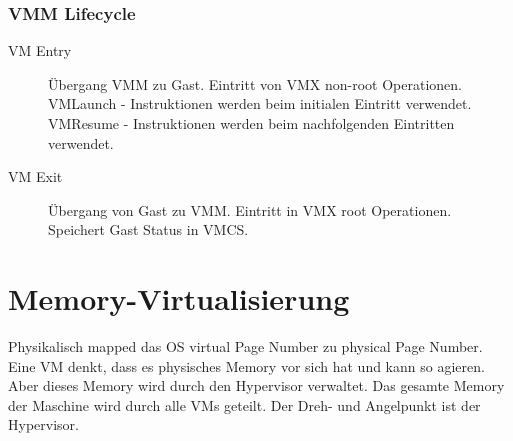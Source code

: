\subsubsection{VMM Lifecycle}
\label{sec:vmm-lifecycle}
\begin{description}
	\item[VM Entry] Übergang VMM zu Gast. Eintritt von VMX non-root Operationen. VMLaunch - Instruktionen werden beim initialen Eintritt verwendet. VMResume - Instruktionen werden beim nachfolgenden Eintritten verwendet.
	\item[VM Exit] Übergang von Gast zu VMM. Eintritt in VMX root Operationen. Speichert Gast Status in VMCS.
\end{description}

\section{Memory-Virtualisierung}
Physikalisch mapped das OS virtual Page Number zu physical Page Number. Eine VM denkt, dass es physisches Memory vor sich hat und kann so agieren. Aber dieses Memory wird durch den Hypervisor verwaltet. Das gesamte Memory der Maschine wird durch alle VMs geteilt. Der Dreh- und Angelpunkt ist der Hypervisor.

